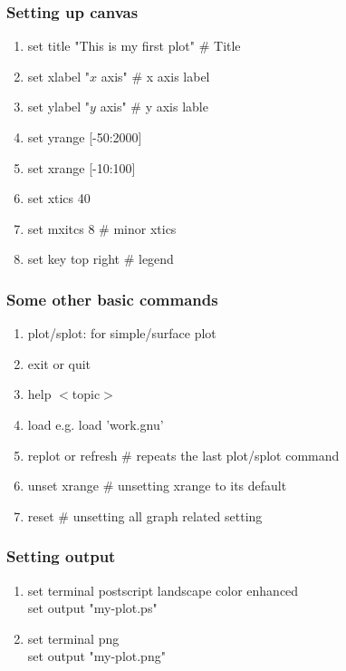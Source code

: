 \documentclass{beamer}
\begin{document}
	\begin{frame}
		\frametitle{Setting up canvas}
		\footnotesize
		\begin{enumerate}
			\item set title "This is my first plot"\hspace{1cm} \# Title
			\item set xlabel "$x$ axis" 	\hspace{1cm} \# x axis label
			\item set ylabel "$y$ axis"		\hspace{1cm} \# y axis lable
			\item set yrange [-50:2000]
			\item set xrange [-10:100]
			\item set xtics  40
			\item set mxitcs 8		\hspace{1cm} \# minor xtics
			\item set key top right	\hspace{1cm} \# legend
		\end{enumerate}
	\end{frame}
	\begin{frame}
		\frametitle{Some other basic commands}
		\footnotesize
		\begin{enumerate}
			\item plot/splot: for simple/surface plot
			\item exit or quit 	
			\item help {$<$topic$>$} 		
			\item load  e.g.   load 'work.gnu'
			\item replot or refresh \hspace{1cm}\#  repeats the last plot/splot command
			\item unset xrange    \hspace{1cm}\# unsetting xrange to its default
			\item reset			 \hspace{1cm}\# unsetting  all graph related setting
		\end{enumerate}
	\end{frame}
	\begin{frame}
		\frametitle{Setting output}
		\begin{enumerate}
			\item set terminal postscript landscape color enhanced\\
				set output "my-plot.ps" 
			\item set terminal png\\
				set output "my-plot.png" 
		\end{enumerate}
		
	\end{frame}	
\end{document}
